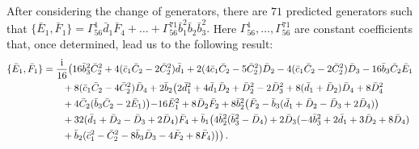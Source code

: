 \documentclass[10pt]{amsart}
\theoremstyle{definition}
\theoremstyle{corollary}
\theoremstyle{remark}
\theoremstyle{conclusion}
\begin{document}
 After considering the change of generators, there are $71$ predicted generators such that $\{\bar{E}_1,\bar{F}_1\} = \Gamma_{56}^1 \bar{d}_1\bar{F}_4 +\ldots +\Gamma_{56}^{71} \bar{b}_1^2\bar{b}_2 \bar{b}_3^2.$ Here $\Gamma_{56}^1,\ldots,\Gamma_{56}^{71}$ are constant coefficients that,  once determined, lead us to the following result:  \begin{align}
 \{\bar{E}_1, \bar{F}_1\}&=\frac{{\rm i}}{16}\bigl(16 \bar{b}_3^2 \bar{C}_2^2+4(\bar{c}_1 \bar{C}_2-2\bar{C}_2^2)\bar{d}_1+2(4 \bar{c}_1 \bar{C}_2-5 \bar{C}_2^2)\bar{D}_2-4(\bar{c}_1 \bar{C}_2-2\bar{C}_2^2)\bar{D}_3-16 \bar{b}_3 \bar{C}_2 \bar{E}_1 \nonumber\\
& \hskip 0.7cm + 8(\bar{c}_1 \bar{C}_2-4\bar{C}_2^2)\bar{D}_4+2\bar{b}_2\bigl(2 \bar{d}_1^2+4 \bar{d}_1 \bar{D}_2+\bar{D}_2^2-2\bar{D}_3^2+8(\bar{d}_1+\bar{D}_2)\bar{D}_4+8 \bar{D}_4^2 \nonumber\\
& \hskip 0.7cm +4 \bar{C}_2(\bar{b}_3 \bar{C}_2-2\bar{E}_1)\bigl)-16 \bar{E}_1^2+8 \bar{D}_2 \bar{F}_2+8 \bar{b}_2^2\bigl(\bar{F}_2-\bar{b}_3(\bar{d}_1+\bar{D}_2-\bar{D}_3+2\bar{D}_4)\bigl)\nonumber\\ 
& \hskip 0.7cm +32 (\bar{d}_1+\bar{D}_2-\bar{D}_3+2\bar{D}_4)\bar{F}_4+\bar{b}_1\bigl(4 \bar{b}_2^2(\bar{b}_3^2-\bar{D}_4)+2\bar{D}_3(-4\bar{b}_3^2+2\bar{d}_1+3\bar{D}_2+8\bar{D}_4)\nonumber\\
& \hskip 0.7cm +\bar{b}_2(\bar{c}_1^2-\bar{C}_2^2-8 \bar{b}_3 \bar{D}_3-4 \bar{F}_2+8\bar{F}_4) \bigl) \bigl) \, . 
\end{align}
\end{document}
